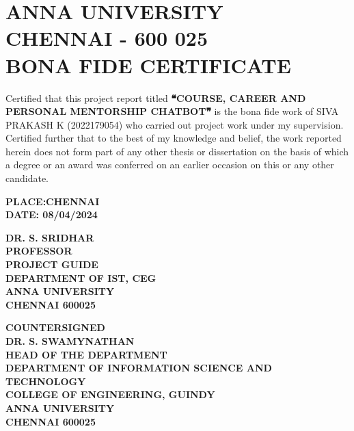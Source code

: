 \documentclass[13pt,a4paper]{aureportm} %
\begin{document}
\chapter*{ANNA UNIVERSITY\\
CHENNAI - 600 025\\
BONA FIDE CERTIFICATE}

\newlength{\aulength}
\settowidth{\aulength}{Anna University
  Chennai}
\newlength{\datewidth}
\settowidth{\datewidth}{Chennai 600 025}

\begin{spacing}{1.5}
  \begin{sloppypar}
  \fontsize{13}{14.5}\selectfont Certified that this project report titled \textbf{❝COURSE, CAREER AND PERSONAL MENTORSHIP CHATBOT❞} is the bona fide work of SIVA PRAKASH K (2022179054) who carried out project work under my supervision. Certified further that to the best of my knowledge and belief, the work reported herein does not form part of any other thesis or dissertation on the basis of which a degree or an award was conferred on an earlier occasion on this or any other candidate.
  \end{sloppypar}
\end{spacing}
\vspace{-0.3 cm}
\begin{flushleft}
 \parbox[t]{\datewidth}{\small{\textbf{PLACE:CHENNAI}}\\
 \small{\textbf{DATE: 08/04/2024}}}
 \hfill
 \parbox[t]{6 cm}{\small{\textbf{DR. S. SRIDHAR}} \\
 \small{\textbf{PROFESSOR}}\\
 \small{\textbf{PROJECT GUIDE}}\\
 \small{\textbf{DEPARTMENT OF IST, CEG}}\\
 \small{\textbf{ANNA UNIVERSITY}}   \\
 \small{\textbf{CHENNAI  600025}}
 }
\end{flushleft}
\begin{center}
 \small{\textbf{COUNTERSIGNED}}\\
  \vspace{1.5 cm}
  \textbf{\small{DR. S. SWAMYNATHAN}}\\
  \small{\textbf{HEAD OF THE DEPARTMENT}}\\
 \small{\textbf{DEPARTMENT OF INFORMATION SCIENCE AND TECHNOLOGY}}\\
 \small{\textbf{COLLEGE OF ENGINEERING, GUINDY}}\\
 \small{\textbf{ANNA UNIVERSITY}}   \\
 \small{\textbf{CHENNAI  600025}}
\end{center}
\end{document}
